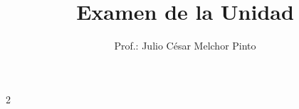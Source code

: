 \documentclass[12pt,addpoints]{evalua}
\title{Examen de la Unidad}
\author{Prof.: Julio César Melchor Pinto}
\begin{document}
%
\begin{multicols}{2}
      
      
      
      
\end{multicols}
\begin{questions}








\end{questions}
\end{document}

